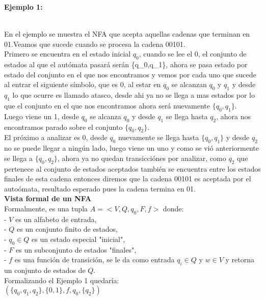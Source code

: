 \documentclass[12pt,a4paper]{article}
\begin{document}
\textbf{Ejemplo 1:}\\
\\ En el ejemplo se muestra el NFA que acepta aquellas cadenas que terminan en 01.Veamos que sucede cuando se procesa la cadena 00101.\\
Primero se encuentra en el estado inicial $q_{0}$, cuando se lee el 0, el conjunto de estados al que el aut\'omata pasar\'a ser\'an \{q_{0},q_{1}\}, ahora se pasa estado por estado del conjunto en el que nos encontramos y vemos por cada uno que sucede al entrar el siguiente s\'imbolo, que es 0, al estar en $q_0$ se alcanzan $q_{0}$ y $q_{1}$ y desde $q_{1}$ lo que ocurre es llamado atasco, desde ahi ya no se llega a mas estados por lo que el conjunto en el que nos encontramos ahora ser\'a nuevamente $\{q_{0},q_{1}\}$.\\ Luego viene un 1, desde $q_{0}$ se alcanza $q_{0}$ y desde $q_{1}$ se llega hasta $q_{2}$, ahora nos encontramos parado sobre el conjunto $\{q_{0},q_{2}\}$.\\ El pr\'oximo a analizar es 0, desde $q_{0}$ nuevamente se llega hasta $\{q_{0},q_{1}\}$ y desde $q_{2}$ no se puede llegar a ning\'un lado, luego viene un uno y  como se vi\'o anteriormente se llega a 
$\{q_{0},q_{2}\}$, ahora ya no quedan transicci\'ones por analizar, como $q_{2}$ que pertenece al conjunto de estados aceptados tambi\'en se encuentra entre los estados finales de esta cadena entonces diremos que la cadena 00101 es aceptada por el auto\'omata, resultado esperado pues la cadena termina en 01.\\
\textbf{Vista formal de un NFA}\\
Formalmente, es una tupla $A = < V,Q,q_0,F,f >$ donde:\\
- $V$ es un alfabeto de entrada,\\
- $Q$ es un conjunto finito de estados,\\
- $q_0 \in Q$ es un estado especial "inicial",\\
- $F$ es un subconjunto de estados "finales",\\
- $f$ es una función de transición, se le da como entrada $q_{i}\in Q$ y $w\in V$ y retorna un conjunto de estados de $Q$.\\
Formalizando el Ejemplo 1 quedar\'ia:\\
$(\{q_{0},q_{1},q_{2}\}, \{0,1\},f,q_{0},\{q_{2}\})$\\
\end{document}
